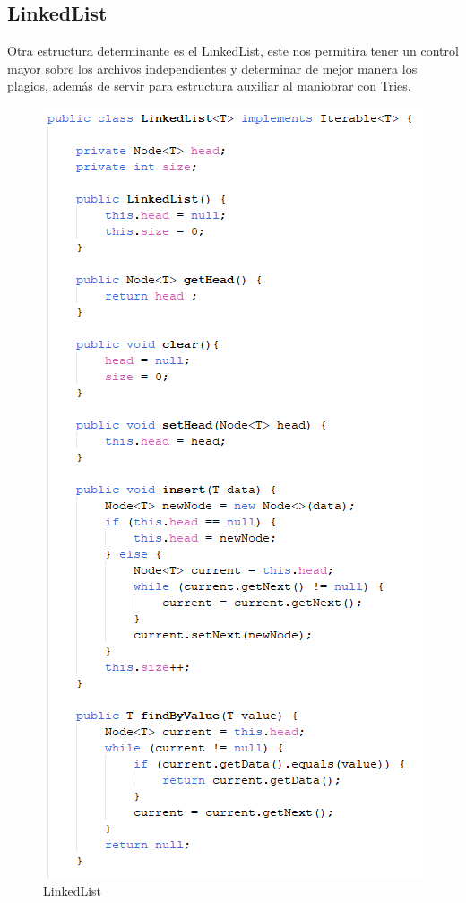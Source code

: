 \documentclass[a4paper]{article}
\begin{document}
\begin{multicols}{2}
\subsection{LinkedList}
Otra estructura determinante es el LinkedList, este nos permitira tener un control mayor sobre los archivos independientes y determinar de mejor manera los plagios, además de servir para estructura auxiliar al maniobrar con Tries.
\begin{figure}[H]
    \centering
    \includegraphics[width=1\linewidth]{img/LinkedList.png}
    \caption{LinkedList}
    \label{fig:enter-label}
\end{figure}





\end{multicols}
\end{document}
